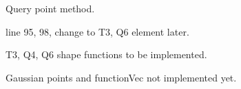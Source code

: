 
\begin{DoxyRefList}
\item[\label{todo__todo000001}%
\Hypertarget{todo__todo000001}%
File \mbox{\hyperlink{_analysis_8h}{Analysis.h}} ]Query point method.  
\item[\label{todo__todo000002}%
\Hypertarget{todo__todo000002}%
File \mbox{\hyperlink{_mesh_8cpp}{Mesh.cpp}} ]line 95, 98, change to T3, Q6 element later.  
\item[\label{todo__todo000003}%
\Hypertarget{todo__todo000003}%
File \mbox{\hyperlink{_shape_8h}{Shape.h}} ]T3, Q4, Q6 shape functions to be implemented.  
\item[\label{todo__todo000004}%
\Hypertarget{todo__todo000004}%
File \mbox{\hyperlink{_shape_q4_8h}{Shape\+Q4.h}} ]Gaussian points and function\+Vec not implemented yet. 
\end{DoxyRefList}